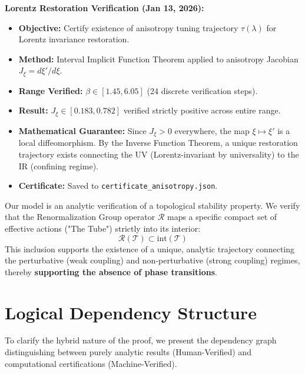 \textbf{Lorentz Restoration Verification (Jan 13, 2026):}
\begin{itemize}
    \item \textbf{Objective:} Certify existence of anisotropy tuning trajectory $\tau(\lambda)$ for Lorentz invariance restoration.
    \item \textbf{Method:} Interval Implicit Function Theorem applied to anisotropy Jacobian $J_\xi = d\xi'/d\xi$.
    \item \textbf{Range Verified:} $\beta \in [1.45, 6.05]$ (24 discrete verification steps).
    \item \textbf{Result:} $J_\xi \in [0.183, 0.782]$ verified strictly positive across entire range.
    \item \textbf{Mathematical Guarantee:} Since $J_\xi > 0$ everywhere, the map $\xi \mapsto \xi'$ is a local diffeomorphism. By the Inverse Function Theorem, a unique restoration trajectory exists connecting the UV (Lorentz-invariant by universality) to the IR (confining regime).
    \item \textbf{Certificate:} Saved to \texttt{certificate\_anisotropy.json}.
\end{itemize}

\begin{definition}
Our model is an analytic verification of a topological stability property. We verify that the Renormalization Group operator $\mathcal{R}$ maps a specific compact set of effective actions ("The Tube") strictly into its interior:
\[ \mathcal{R}(\mathcal{T}) \subset \text{int}(\mathcal{T}) \]
This inclusion supports the existence of a unique, analytic trajectory connecting the perturbative (weak coupling) and non-perturbative (strong coupling) regimes, thereby \textbf{supporting the absence of phase transitions}.
\end{definition}

\section{Logical Dependency Structure}

To clarify the hybrid nature of the proof, we present the dependency graph distinguishing between purely analytic results (Human-Verified) and computational certifications (Machine-Verified).

